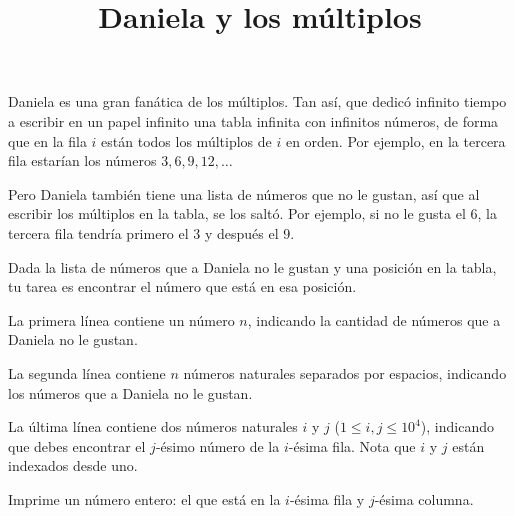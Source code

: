 \documentclass{oci}
\title{Daniela y los múltiplos}
\begin{document}
\begin{problemDescription}
	Daniela es una gran fanática de los múltiplos. Tan así, que dedicó infinito tiempo a escribir en un papel infinito
	una tabla infinita con infinitos números, de forma que en la fila $i$ están todos los múltiplos de $i$ en orden.
	Por ejemplo, en la tercera fila estarían los números $3, 6, 9, 12, \dots$

	Pero Daniela también tiene una lista de números que no le gustan, así que al escribir los múltiplos en la tabla,
	se los saltó. Por ejemplo, si no le gusta el 6, la tercera fila tendría primero el 3 y después el 9.

	Dada la lista de números que a Daniela no le gustan y una posición en la tabla, tu tarea es encontrar el
	número que está en esa posición.


\end{problemDescription}

\begin{inputDescription}
	La primera línea contiene un número $n$, indicando la cantidad de números que a Daniela no le gustan.
	
	La segunda línea contiene $n$ números naturales separados por espacios, indicando los números que a Daniela no le gustan.

	La última línea contiene dos números naturales $i$ y $j$ ($1 \leq i, j \leq 10^4$), indicando que debes encontrar el $j$-ésimo número
	de la $i$-ésima fila. Nota que $i$ y $j$ están indexados desde uno.
\end{inputDescription}

\begin{outputDescription}
	Imprime un número entero: el que está en la $i$-ésima fila y $j$-ésima columna.
\end{outputDescription}

\begin{sampleDescription}
\end{sampleDescription}
\end{document}
